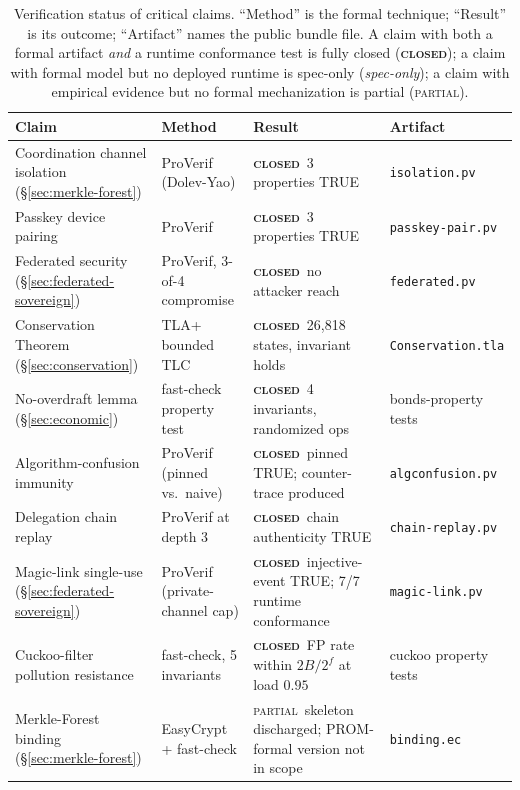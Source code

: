 \documentclass[11pt,a4paper]{article}
\newcommand{\Closed}{{\textcolor{hhink}{\textsc{\textbf{closed}}}}}
\newcommand{\Partial}{{\textcolor{hhink}{\textsc{partial}}}}
\newcommand{\SpecOnly}{{\textcolor{hhgray}{\textit{spec-only}}}}
\theoremstyle{definition}
\theoremstyle{remark}
\begin{document}
\renewcommand{\arraystretch}{1.15}
\begin{table}[H]
\centering
\caption{Verification status of critical claims. ``Method'' is the formal technique; ``Result'' is its outcome; ``Artifact'' names the public bundle file. A claim with both a formal artifact \emph{and} a runtime conformance test is fully closed (\Closed); a claim with formal model but no deployed runtime is spec-only (\SpecOnly); a claim with empirical evidence but no formal mechanization is partial (\Partial).}
\label{tab:verification-status}
\small
\begin{tabularx}{\textwidth}{@{}>{\raggedright\arraybackslash}p{} >{\raggedright\arraybackslash}p{} >{\raggedright\arraybackslash}X >{\raggedright\arraybackslash}p{}@{}}
\toprule
\textbf{Claim} & \textbf{Method} & \textbf{Result} & \textbf{Artifact} \\
\midrule
Coordination channel isolation (\S\ref{sec:merkle-forest}) & ProVerif (Dolev-Yao) & \Closed\ 3 properties TRUE & \texttt{isolation.pv} \\
Passkey device pairing & ProVerif & \Closed\ 3 properties TRUE & \texttt{passkey-pair.pv} \\
Federated security (\S\ref{sec:federated-sovereign}) & ProVerif, 3-of-4 compromise & \Closed\ no attacker reach & \texttt{federated.pv} \\
Conservation Theorem (\S\ref{sec:conservation}) & TLA+ bounded TLC & \Closed\ 26{,}818 states, invariant holds & \texttt{Conservation.tla} \\
No-overdraft lemma (\S\ref{sec:economic}) & fast-check property test & \Closed\ 4 invariants, randomized ops & bonds-property tests \\
Algorithm-confusion immunity & ProVerif (pinned vs.\ naive) & \Closed\ pinned TRUE; counter-trace produced & \texttt{algconfusion.pv} \\
Delegation chain replay & ProVerif at depth 3 & \Closed\ chain authenticity TRUE & \texttt{chain-replay.pv} \\
Magic-link single-use (\S\ref{sec:federated-sovereign}) & ProVerif (private-channel cap) & \Closed\ injective-event TRUE; 7/7 runtime conformance & \texttt{magic-link.pv} \\
Cuckoo-filter pollution resistance & fast-check, 5 invariants & \Closed\ FP rate within $2B/2^f$ at load $0.95$ & cuckoo property tests \\
\midrule
Merkle-Forest binding (\S\ref{sec:merkle-forest}) & EasyCrypt + fast-check & \Partial\ skeleton discharged; PROM-formal version not in scope & \texttt{binding.ec} \\

\end{tabularx}
\end{table}
\end{document}
